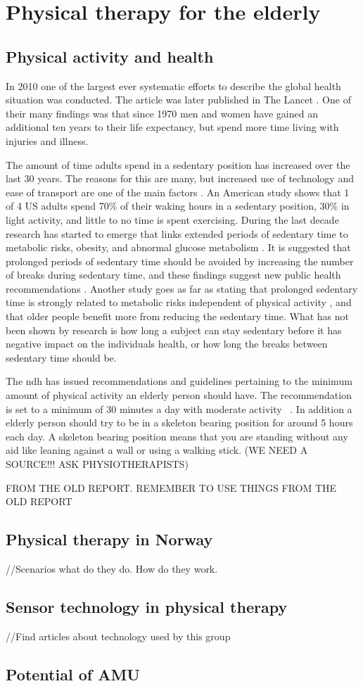 \chapter{Physical therapy for the elderly}

\section{Physical activity and health}
In 2010 one of the largest ever systematic efforts to describe the global health situation was conducted. The article was later published in The Lancet \cite{globalBurden}. One of their many findings was that since 1970 men and women have gained an additional ten years to their life expectancy, but spend more time living with injuries and illness. 

The amount of time adults spend in a sedentary position has increased over the last 30 years. The reasons for this are many, but increased use of technology and ease of transport are one of the main factors \cite{sedentaryBehaviour}. An American study shows that 1 of 4 US adults spend 70\% of their waking hours in a sedentary position, 30\% in light activity, and little to no time is spent exercising. During the last decade research has started to emerge that links extended periods of sedentary time to metabolic risks\cite{sedentaryTime}, obesity, and abnormal glucose metabolism \cite{breaksSedentary}. It is suggested that prolonged periods of sedentary time should be avoided by increasing the number of breaks during sedentary time, and these findings suggest new public health recommendations \cite{breaksSedentary}. Another study goes as far as stating that prolonged sedentary time is strongly related to metabolic risks independent of physical activity \cite{sedentaryActivity}, and that older people benefit more from reducing the sedentary time. What has not been shown by research is how long a subject can stay sedentary before it has negative impact on the individuals health, or how long the breaks between sedentary time should be.

The \gls{ndh} has issued recommendations and guidelines pertaining to the minimum amount of physical activity an elderly person should have. The recommendation is set to a minimum of 30 minutes a day with moderate activity ~\cite{helsedirektoratetFysiskAktivitet}. In addition a elderly person should try to be in a skeleton bearing position for around 5 hours each day. A skeleton bearing position means that you are standing without any aid like leaning against a wall or using a walking stick. (WE NEED A SOURCE!!! ASK PHYSIOTHERAPISTS)

FROM THE OLD REPORT. REMEMBER TO USE THINGS FROM THE OLD REPORT

\section{Physical therapy in Norway}
//Scenarios what do they do. How do they work.

\section{Sensor technology in physical therapy}
//Find articles about technology used by this group

\section{Potential of AMU}
